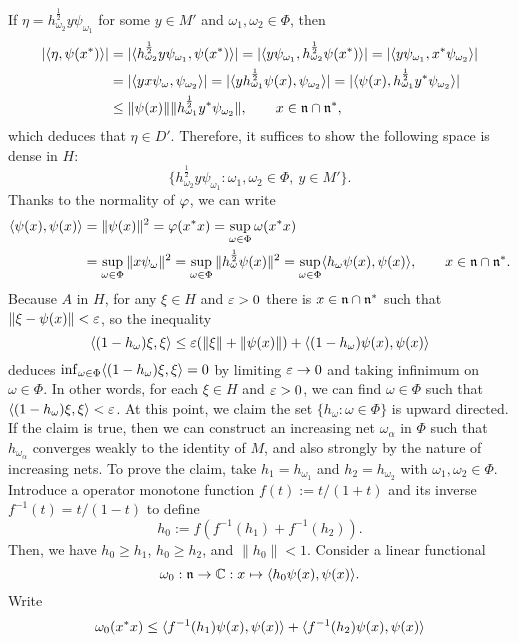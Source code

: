 \documentclass{../../small}
\begin{document}
\begin{pf}
If $\eta=h_{\omega_2}^{\frac12}y\psi_{\omega_1}$ for some $y\in M'$ and $\omega_1,\omega_2\in\Phi$, then
\begin{align*}
|\langle\eta,\psi(x^*)\rangle|
&=|\langle h_{\omega_2}^{\frac12}y\psi_{\omega_1},\psi(x^*)\rangle|=|\langle y\psi_{\omega_1},h_{\omega_2}^{\frac12}\psi(x^*)\rangle|=|\langle y\psi_{\omega_1},x^*\psi_{\omega_2}\rangle|\\
&=|\langle yx\psi_\omega,\psi_{\omega_2}\rangle|=|\langle yh_{\omega_1}^{\frac12}\psi(x),\psi_{\omega_2}\rangle|=|\langle\psi(x),h_{\omega_1}^{\frac12}y^*\psi_{\omega_2}\rangle|\\
&\le\|\psi(x)\|\|h_{\omega_1}^{\frac12}y^*\psi_{\omega_2}\|,\qquad x\in\mathfrak{n}\cap\mathfrak{n}^*,
\end{align*}
which deduces that $\eta\in D'$.
Therefore, it suffices to show the following space is dense in $H$:
\[\{h_{\omega_2}^{\frac12}y\psi_{\omega_1}:\omega_1,\omega_2\in\Phi,\ y\in M'\}.\]
Thanks to the normality of $\varphi$, we can write
\begin{align*}
\langle\psi(x),\psi(x)\rangle&=\|\psi(x)\|^2=\varphi(x^*x)=\sup_{\omega\in\Phi}\omega(x^*x)\\
&=\sup_{\omega\in\Phi}\|x\psi_\omega\|^2=\sup_{\omega\in\Phi}\|h_\omega^{\frac12}\psi(x)\|^2=\sup_{\omega\in\Phi}\langle h_\omega\psi(x),\psi(x)\rangle,\qquad x\in\mathfrak{n}\cap\mathfrak{n}^*.
\end{align*}
Because $A$ in $H$, for any $\xi\in H$ and $\varepsilon>0$ there is $x\in\mathfrak{n}\cap\mathfrak{n}^*$ such that $\|\xi-\psi(x)\|<\varepsilon$, so the inequality
\[\langle(1-h_\omega)\xi,\xi\rangle\le\varepsilon(\|\xi\|+\|\psi(x)\|)+\langle(1-h_\omega)\psi(x),\psi(x)\rangle\]
deduces $\inf_{\omega\in\Phi}\langle(1-h_\omega)\xi,\xi\rangle=0$ by limiting $\varepsilon\to0$ and taking infinimum on $\omega\in\Phi$.
In other words, for each $\xi\in H$ and $\varepsilon>0$, we can find $\omega\in\Phi$ such that $\langle(1-h_\omega)\xi,\xi\rangle<\varepsilon$.
At this point, we claim the set $\{h_\omega:\omega\in\Phi\}$ is upward directed.
If the claim is true, then we can construct an increasing net $\omega_\alpha$ in $\Phi$ such that $h_{\omega_\alpha}$ converges weakly to the identity of $M$, and also strongly by the nature of increasing nets.
To prove the claim, take $h_1=h_{\omega_1}$ and $h_2=h_{\omega_2}$ with $\omega_1,\omega_2\in\Phi$.
Introduce a operator monotone function $f(t):=t/(1+t)$ and its inverse $f^{-1}(t)=t/(1-t)$ to define 
\[h_0:=f(f^{-1}(h_1)+f^{-1}(h_2)).\]
Then, we have $h_0\ge h_1$, $h_0\ge h_2$, and $\|h_0\|<1$.
Consider a linear functional
\[\omega_0:\mathfrak{n}\to\mathbb{C}:x\mapsto\langle h_0\psi(x),\psi(x)\rangle.\]
Write
\begin{align*}
\omega_0(x^*x)
&\le\<f^{-1}(h_1)\psi(x),\psi(x)\>+\<f^{-1}(h_2)\psi(x),\psi(x)\>\\

\end{align*}
\end{pf}
\end{document}
